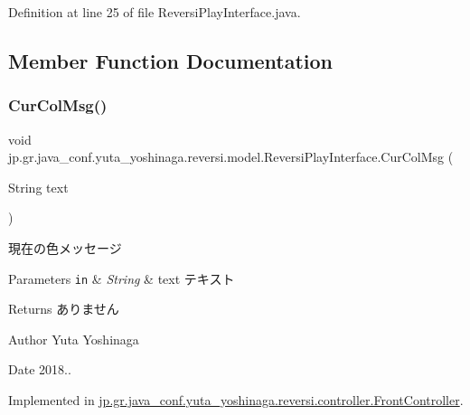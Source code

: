 Definition at line 25 of file Reversi\+Play\+Interface.\+java.



\subsection{Member Function Documentation}
\mbox{\label{interfacejp_1_1gr_1_1java__conf_1_1yuta__yoshinaga_1_1reversi_1_1model_1_1_reversi_play_interface_a73764de038c314fd103a91d402049a0c}} 
\subsubsection{\texorpdfstring{Cur\+Col\+Msg()}{CurColMsg()}}
{\footnotesize\ttfamily void jp.\+gr.\+java\+\_\+conf.\+yuta\+\_\+yoshinaga.\+reversi.\+model.\+Reversi\+Play\+Interface.\+Cur\+Col\+Msg (\begin{DoxyParamCaption}\item[{String}]{text }\end{DoxyParamCaption})}



現在の色メッセージ 


\begin{DoxyParams}[1]{Parameters}
\mbox{\tt in}  & {\em String} & text テキスト \\
\hline
\end{DoxyParams}
\begin{DoxyReturn}{Returns}
ありません 
\end{DoxyReturn}
\begin{DoxyAuthor}{Author}
Yuta Yoshinaga 
\end{DoxyAuthor}
\begin{DoxyDate}{Date}
2018.. 
\end{DoxyDate}


Implemented in \hyperlink{classjp_1_1gr_1_1java__conf_1_1yuta__yoshinaga_1_1reversi_1_1controller_1_1_front_controller_ac49c44c8bb767770364c52164b699110}{jp.\+gr.\+java\+\_\+conf.\+yuta\+\_\+yoshinaga.\+reversi.\+controller.\+Front\+Controller}.



